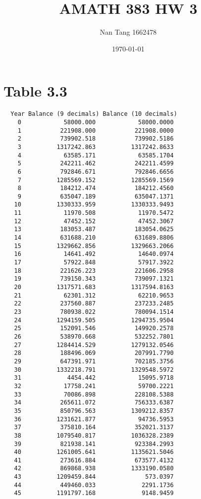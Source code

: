\documentclass[11pt,letterpaper]{article}
\title{AMATH 383 HW 3}
\author{Nan Tang 1662478}
\date{\today}
\begin{document}
\maketitle
 
\section*{Table 3.3}

\begin{verbatim}
  Year Balance (9 decimals) Balance (10 decimals)
    0            58000.000            58000.0000
    1           221908.000           221908.0000
    2           739902.518           739902.5186
    3          1317242.863          1317242.8633
    4            63585.171            63585.1704
    5           242211.462           242211.4599
    6           792846.671           792846.6656
    7          1285569.152          1285569.1569
    8           184212.474           184212.4560
    9           635047.189           635047.1371
   10          1330333.959          1330333.9493
   11            11970.508            11970.5472
   12            47452.152            47452.3067
   13           183053.487           183054.0625
   14           631688.210           631689.8806
   15          1329662.856          1329663.2066
   16            14641.492            14640.0974
   17            57922.848            57917.3922
   18           221626.223           221606.2958
   19           739150.343           739097.1321
   20          1317571.683          1317594.8163
   21            62301.312            62210.9653
   22           237560.887           237233.2485
   23           780938.022           780094.1514
   24          1294159.505          1294735.9504
   25           152091.546           149920.2578
   26           538970.668           532252.7801
   27          1284414.529          1279132.0546
   28           188496.069           207991.7790
   29           647391.971           702185.3756
   30          1332218.791          1329548.5972
   31             4454.442            15095.9718
   32            17758.241            59700.2221
   33            70086.898           228108.5388
   34           265611.072           756333.6387
   35           850796.563          1309212.8357
   36          1231621.877            94736.5953
   37           375810.164           352021.3137
   38          1079540.817          1036328.2389
   39           821938.141           923384.2993
   40          1261005.641          1135621.5046
   41           273616.884           673577.4132
   42           869868.938          1333190.0580
   43          1209459.844              573.0397
   44           449460.033             2291.1736
   45          1191797.168             9148.9459
\end{verbatim}
 
\end{document}
